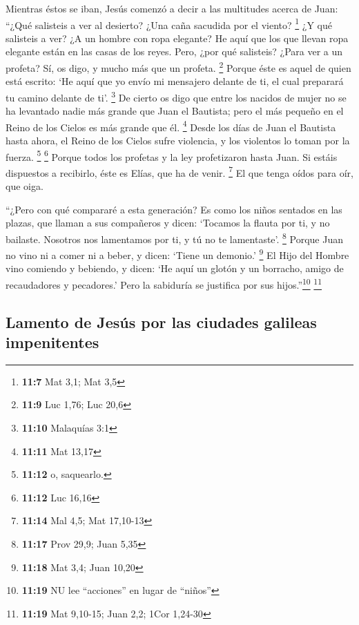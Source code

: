 \begin{paracol}{2}
 Mientras éstos se iban, Jesús comenzó a decir a las
multitudes acerca de Juan: ``¿Qué salisteis a ver al desierto? ¿Una caña
sacudida por el viento? \footnote{\textbf{11:7} Mat 3,1; Mat 3,5}
 ¿Y qué salisteis a ver? ¿A un hombre con ropa elegante?
He aquí que los que llevan ropa elegante están en las casas de los
reyes.  Pero, ¿por qué salisteis? ¿Para ver a un profeta?
Sí, os digo, y mucho más que un profeta. \footnote{\textbf{11:9} Luc
  1,76; Luc 20,6}  Porque éste es aquel de quien está
escrito: `He aquí que yo envío mi mensajero delante de ti, el cual
preparará tu camino delante de ti'. \footnote{\textbf{11:10} Malaquías
  3:1}  De cierto os digo que entre los nacidos de mujer
no se ha levantado nadie más grande que Juan el Bautista; pero el más
pequeño en el Reino de los Cielos es más grande que él. \footnote{\textbf{11:11}
  Mat 13,17}  Desde los días de Juan el Bautista hasta
ahora, el Reino de los Cielos sufre violencia, y los violentos lo toman
por la fuerza. \footnote{\textbf{11:12} o, saquearlo.} \footnote{\textbf{11:12}
  Luc 16,16}  Porque todos los profetas y la ley
profetizaron hasta Juan.  Si estáis dispuestos a
recibirlo, éste es Elías, que ha de venir. \footnote{\textbf{11:14} Mal
  4,5; Mat 17,10-13}  El que tenga oídos para oír, que
oiga.

 ``¿Pero con qué compararé a esta generación? Es como los
niños sentados en las plazas, que llaman a sus compañeros
 y dicen: `Tocamos la flauta por ti, y no bailaste.
Nosotros nos lamentamos por ti, y tú no te lamentaste'. \footnote{\textbf{11:17}
  Prov 29,9; Juan 5,35}  Porque Juan no vino ni a comer
ni a beber, y dicen: `Tiene un demonio.' \footnote{\textbf{11:18} Mat
  3,4; Juan 10,20}  El Hijo del Hombre vino comiendo y
bebiendo, y dicen: `He aquí un glotón y un borracho, amigo de
recaudadores y pecadores.' Pero la sabiduría se justifica por sus
hijos.''\footnote{\textbf{11:19} NU lee ``acciones'' en lugar de
  ``niños''} \footnote{\textbf{11:19} Mat 9,10-15; Juan 2,2; 1Cor
  1,24-30}

\hypertarget{lamento-de-jesuxfas-por-las-ciudades-galileas-impenitentes}{%
\subsection{Lamento de Jesús por las ciudades galileas
impenitentes}\label{lamento-de-jesuxfas-por-las-ciudades-galileas-impenitentes}}


\end{paracol}
